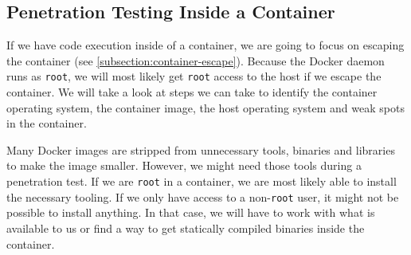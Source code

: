 \subsection{Penetration Testing Inside a Container}\label{subsection:testing-container}
If we have code execution inside of a container, we are going to focus on escaping the container (see \autoref{subsection:container-escape}). Because the Docker daemon runs as \lstinline{root}, we will most likely get \lstinline{root} access to the host if we escape the container. We will take a look at steps we can take to identify the container operating system, the container image, the host operating system and weak spots in the container.

\medskip

Many Docker images are stripped from unnecessary tools, binaries and libraries to make the image smaller. However, we might need those tools during a penetration test. If we are \lstinline{root} in a container, we are most likely able to install the necessary tooling. If we only have access to a non-\lstinline{root} user, it might not be possible to install anything. In that case, we will have to work with what is available to us or find a way to get statically compiled binaries inside the container.










